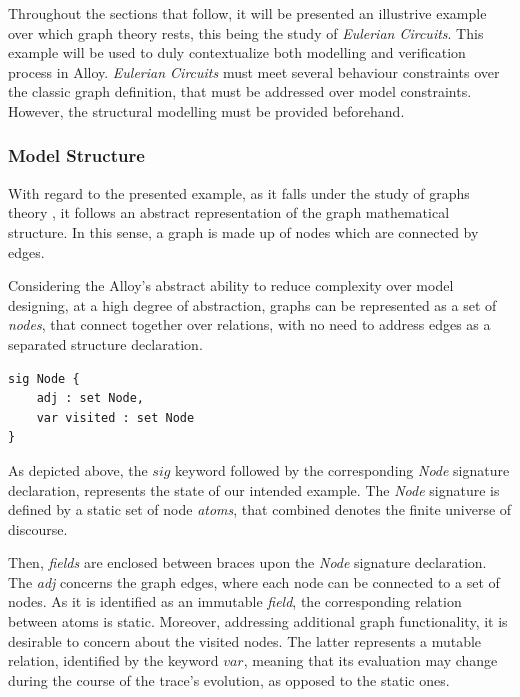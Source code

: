 Throughout the sections that follow, it will be presented an illustrive example over which graph theory rests, this being the study of \textit{Eulerian Circuits}. This example will be used to duly contextualize both modelling and verification process in Alloy. \textit{Eulerian Circuits} must meet several behaviour constraints over the classic graph definition, that must be addressed over model constraints. However, the structural modelling must be provided beforehand.

\subsubsection{Model Structure}

With regard to the presented example, as it falls under the study of graphs theory \cite{west2001introduction}, it follows an abstract representation of the graph mathematical structure. In this sense, a graph is made up of nodes which are connected by edges. 

Considering the Alloy's abstract ability to reduce complexity over model designing, at a high degree of abstraction, graphs can be represented as a set of \textit{nodes}, that connect together over relations, with no need to address edges as a separated structure declaration. 

\begin{lstlisting}[title={Graph representation over a sigle Node declaration.}, otherkeywords = {abstract, sig, module, var, set, fact, extends, no, in}, label={lst:node},floatplacement=H]
sig Node {
    adj : set Node, 
    var visited : set Node
}
\end{lstlisting}

As depicted above, the $sig$ keyword followed by the corresponding \textit{Node} signature declaration, represents the state of our intended example. The \textit{Node} signature is defined by a static set of node \textit{atoms}, that combined denotes the finite universe of discourse.

Then, \textit{fields} are enclosed between braces upon the \textit{Node} signature declaration. The \textit{adj} concerns the graph edges, where each node can be connected to a set of nodes. As it is identified as an immutable \textit{field}, the corresponding relation between atoms is static. Moreover, addressing additional graph functionality, it is desirable to concern about the visited nodes. The latter represents a mutable relation, identified by the keyword $var$, meaning that its evaluation may change during the course of the trace's evolution, as opposed to the static ones. 

